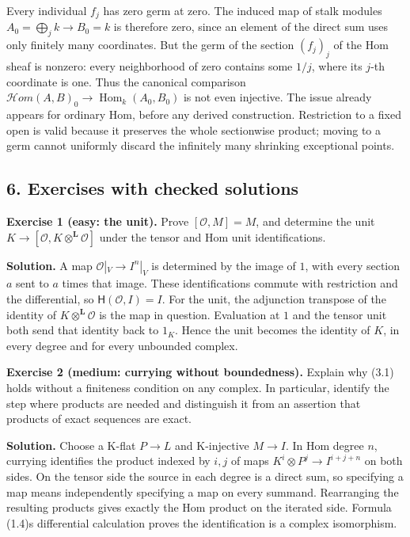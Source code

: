 \documentclass[
  english,
  11pt,
  a4paper,
]{article}
\begin{document}
Every individual \(f_j\) has zero germ at zero. The induced map of stalk
modules \(A_0=\bigoplus_j k\to B_0=k\) is therefore zero, since an
element of the direct sum uses only finitely many coordinates. But the
germ of the section \((f_j)_j\) of the Hom sheaf is nonzero: every
neighborhood of zero contains some \(1/j\), where its \(j\)-th
coordinate is one. Thus the canonical comparison
\(\mathcal Hom(A,B)_0\to\operatorname{Hom}_k(A_0,B_0)\) is not even
injective. The issue already appears for ordinary Hom, before any
derived construction. Restriction to a fixed open is valid because it
preserves the whole sectionwise product; moving to a germ cannot
uniformly discard the infinitely many shrinking exceptional points.

\subsection{6. Exercises with checked
solutions}\label{internal-derived-hom-and-ext-sheaves--6-exercises-with-checked-solutions}

\textbf{Exercise 1 (easy: the unit).} Prove \([\mathcal O,M]=M\), and
determine the unit \(K\to[\mathcal O,K\otimes^{\mathbf L}\mathcal O]\)
under the tensor and Hom unit identifications.

\textbf{Solution.} A map \(\mathcal O|_V\to I^n|_V\) is determined by
the image of \(1\), with every section \(a\) sent to \(a\) times that
image. These identifications commute with restriction and the
differential, so \(\mathsf H(\mathcal O,I)=I\). For the unit, the
adjunction transpose of the identity of
\(K\otimes^{\mathbf L}\mathcal O\) is the map in question. Evaluation at
\(1\) and the tensor unit both send that identity back to \(1_K\). Hence
the unit becomes the identity of \(K\), in every degree and for every
unbounded complex.

\textbf{Exercise 2 (medium: currying without boundedness).} Explain why
(3.1) holds without a finiteness condition on any complex. In
particular, identify the step where products are needed and distinguish
it from an assertion that products of exact sequences are exact.

\textbf{Solution.} Choose a K-flat \(P\to L\) and K-injective
\(M\to I\). In Hom degree \(n\), currying identifies the product indexed
by \(i,j\) of maps \(K^i\otimes P^j\to I^{i+j+n}\) on both sides. On the
tensor side the source in each degree is a direct sum, so specifying a
map means independently specifying a map on every summand. Rearranging
the resulting products gives exactly the Hom product on the iterated
side. Formula (1.4)\textquotesingle s differential calculation proves
the identification is a complex isomorphism.
\end{document}
